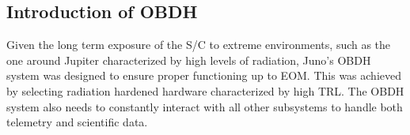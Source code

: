 \subsection{Introduction of OBDH}
\label{subsec:OBDH_inroduction}

Given the long term exposure of the S/C to extreme environments, such as the one around Jupiter characterized by high levels of radiation, Juno's OBDH system was designed to ensure proper functioning up to EOM. This was achieved by selecting radiation hardened hardware characterized by high TRL. The OBDH system also needs to constantly interact with all other subsystems to handle both telemetry and scientific data. 